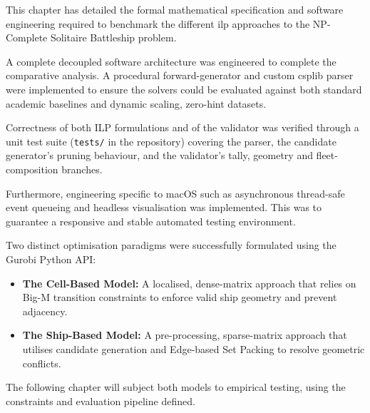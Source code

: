 This chapter has detailed the formal mathematical specification and software engineering required to benchmark the different \gls{ilp} approaches to the NP-Complete Solitaire Battleship problem.

A complete decoupled software architecture was engineered to complete the comparative analysis. A procedural forward-generator and custom \gls{csplib} parser were implemented to ensure the solvers could be evaluated against both standard academic baselines and dynamic scaling, zero-hint datasets.

Correctness of both ILP formulations and of the validator was verified through a unit test suite (\verb|tests/| in the repository) covering the parser, the candidate generator's pruning behaviour, and the validator's tally, geometry and fleet-composition branches.

Furthermore, engineering specific to macOS such as asynchronous thread-safe event queueing and headless visualisation was implemented. This was to guarantee a responsive and stable automated testing environment.

Two distinct optimisation paradigms were successfully formulated using the Gurobi Python API:
\begin{itemize}
    \item \textbf{The Cell-Based Model:} A localised, dense-matrix approach that relies on Big-M transition constraints to enforce valid ship geometry and prevent adjacency.
    \item \textbf{The Ship-Based Model:} A pre-processing, sparse-matrix approach that utilises candidate generation and Edge-based Set Packing to resolve geometric conflicts.
\end{itemize}

The following chapter will subject both models to empirical testing, using the constraints and evaluation pipeline defined.